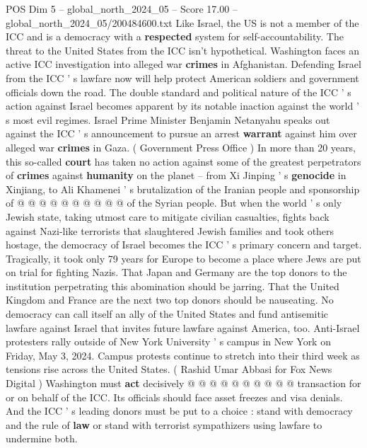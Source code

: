 \begin{textsample}{POS Dim 5 – global\_north\_2024\_05 – Score 17.00 – global\_north\_2024\_05/200484600.txt}
Like Israel, the US is not a member of the ICC and is a democracy with a \textbf{respected} system for self-accountability.
The threat to the United States from the ICC isn't hypothetical.
Washington faces an active ICC investigation into alleged war \textbf{crimes} in Afghanistan.
Defending Israel from the ICC ' s lawfare now will help protect American soldiers and government officials down the road.
The double standard and political nature of the ICC ' s action against Israel becomes apparent by its notable inaction against the world ' s most evil regimes.
Israel Prime Minister Benjamin Netanyahu speaks out against the ICC ' s announcement to pursue an arrest \textbf{warrant} against him over alleged war \textbf{crimes} in Gaza. ( Government Press Office ) In more than 20 years, this so-called \textbf{court} has taken no action against some of the greatest perpetrators of \textbf{crimes} against \textbf{humanity} on the planet -- from Xi Jinping ' s \textbf{genocide} in Xinjiang, to Ali Khamenei ' s brutalization of the Iranian people and sponsorship of @ @ @ @ @ @ @ @ @ @ of the Syrian people.
But when the world ' s only Jewish state, taking utmost care to mitigate civilian casualties, fights back against Nazi-like terrorists that slaughtered Jewish families and took others hostage, the democracy of Israel becomes the ICC ' s primary concern and target.
Tragically, it took only 79 years for Europe to become a place where Jews are put on trial for fighting Nazis.
That Japan and Germany are the top donors to the institution perpetrating this abomination should be jarring.
That the United Kingdom and France are the next two top donors should be nauseating.
No democracy can call itself an ally of the United States and fund antisemitic lawfare against Israel that invites future lawfare against America, too.
Anti-Israel protesters rally outside of New York University ' s campus in New York on Friday, May 3, 2024.
Campus protests continue to stretch into their third week as tensions rise across the United States. ( Rashid Umar Abbasi for Fox News Digital ) Washington must \textbf{act} decisively @ @ @ @ @ @ @ @ @ @ transaction for or on behalf of the ICC.
Its officials should face asset freezes and visa denials.
And the ICC ' s leading donors must be put to a choice : stand with democracy and the rule of \textbf{law} or stand with terrorist sympathizers using lawfare to undermine both.

\end{textsample}
